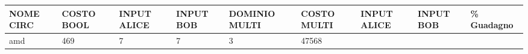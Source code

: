 \documentclass[italian,]{book}
\begin{document}
\begin{longtable}[]{@{}lllllllll@{}}
\toprule
\begin{minipage}[b]{0.07\columnwidth}\raggedright
NOME CIRC\strut
\end{minipage} & \begin{minipage}[b]{0.11\columnwidth}\raggedright
COSTO BOOL\strut
\end{minipage} & \begin{minipage}[b]{0.08\columnwidth}\raggedright
INPUT ALICE\strut
\end{minipage} & \begin{minipage}[b]{0.07\columnwidth}\raggedright
INPUT BOB\strut
\end{minipage} & \begin{minipage}[b]{0.09\columnwidth}\raggedright
DOMINIO MULTI\strut
\end{minipage} & \begin{minipage}[b]{0.12\columnwidth}\raggedright
COSTO MULTI\strut
\end{minipage} & \begin{minipage}[b]{0.08\columnwidth}\raggedright
INPUT ALICE\strut
\end{minipage} & \begin{minipage}[b]{0.07\columnwidth}\raggedright
INPUT BOB\strut
\end{minipage} & \begin{minipage}[b]{0.07\columnwidth}\raggedright
\% Guadagno\strut
\end{minipage}\tabularnewline
\midrule
\endhead
\begin{minipage}[t]{0.07\columnwidth}\raggedright
amd\strut
\end{minipage} & \begin{minipage}[t]{0.11\columnwidth}\raggedright
469\strut
\end{minipage} & \begin{minipage}[t]{0.08\columnwidth}\raggedright
7\strut
\end{minipage} & \begin{minipage}[t]{0.07\columnwidth}\raggedright
7\strut
\end{minipage} & \begin{minipage}[t]{0.09\columnwidth}\raggedright
3\strut
\end{minipage} & \begin{minipage}[t]{0.12\columnwidth}\raggedright
47568\strut
\end{minipage} & \begin{minipage}[t]{0.08\columnwidth}\raggedright

\end{minipage}
\end{longtable}
\end{document}
